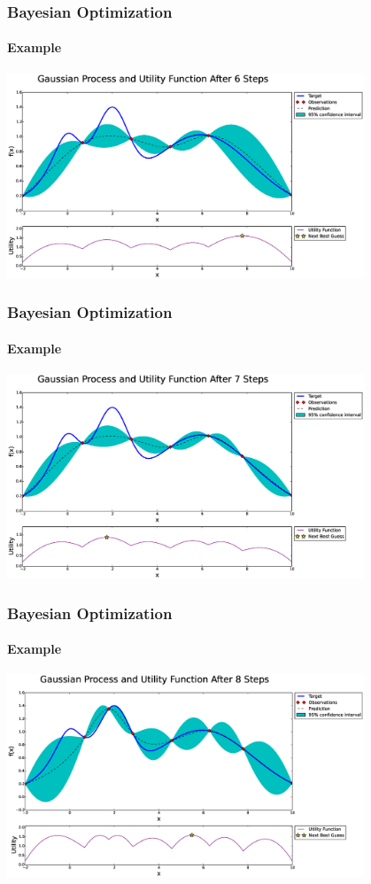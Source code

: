 \begin{frame}
	\frametitle{Bayesian Optimization}
	\framesubtitle{Example}
	
	\centering
	\includegraphics[width=0.8\textwidth]{figures/bayesian-optimization/fig4}
	
\end{frame}

\begin{frame}
	\frametitle{Bayesian Optimization}
	\framesubtitle{Example}
	
	\centering
	\includegraphics[width=0.8\textwidth]{figures/bayesian-optimization/fig5}
	
\end{frame}

\begin{frame}
	\frametitle{Bayesian Optimization}
	\framesubtitle{Example}
	
	\centering
	\includegraphics[width=0.8\textwidth]{figures/bayesian-optimization/fig6}
	
\end{frame}


